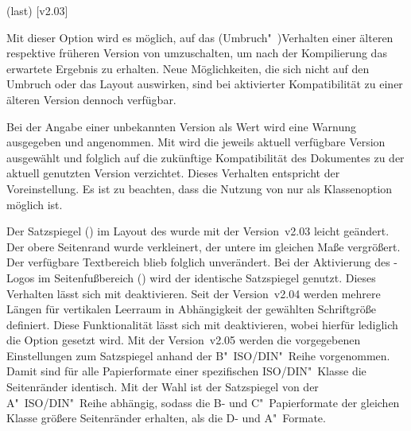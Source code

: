 \begin{Declaration}
  {}
  (last)
  [v2.03]
\printdeclarationlist

Mit dieser Option wird es möglich, auf das (Umbruch"~)Verhalten einer älteren 
respektive früheren Version von \TUDScript umzuschalten, um nach der 
Kompilierung das erwartete Ergebnis zu erhalten. Neue Möglichkeiten, die sich 
nicht auf den Umbruch oder das Layout auswirken, sind bei aktivierter 
Kompatibilität zu einer älteren Version dennoch verfügbar. 

Bei der Angabe einer unbekannten Version als Wert wird eine Warnung ausgegeben 
und  angenommen. Mit  wird die 
jeweils aktuell verfügbare Version ausgewählt und folglich auf die zukünftige 
Kompatibilität des Dokumentes zu der aktuell genutzten Version verzichtet. 
Dieses Verhalten entspricht der Voreinstellung. Es ist zu beachten, dass die 
Nutzung von  nur als Klassenoption möglich ist.
\begin{DeclareValues}
  Der Satzspiegel () im Layout des 
  \CDs wurde mit der Version~v2.03 leicht geändert. Der obere Seitenrand wurde 
  verkleinert, der untere im gleichen Maße vergrößert. Der verfügbare 
  Textbereich blieb folglich unverändert. Bei der Aktivierung des \DDC-Logos im 
  Seitenfußbereich () wird der 
  identische Satzspiegel genutzt. Dieses Verhalten lässt sich mit 
   deaktivieren.
  Seit der Version~v2.04 werden mehrere Längen für vertikalen Leerraum in 
  Abhängigkeit der gewählten Schriftgröße definiert. Diese Funktionalität lässt 
  sich mit  deaktivieren, wobei hierfür lediglich die 
  Option  gesetzt wird. 
  Mit der Version~v2.05 werden die vorgegebenen Einstellungen zum Satzspiegel 
  anhand der B"~ISO/DIN"~Reihe vorgenommen. Damit sind für alle Papierformate 
  einer spezifischen ISO/DIN"~Klasse die Seitenränder identisch. Mit der Wahl 
   ist der Satzspiegel von der A"~ISO/DIN"~Reihe 
  abhängig, sodass die B- und C"~Papierformate der gleichen Klasse größere 
  Seitenränder erhalten, als die D- und A"~Formate.

\end{DeclareValues}
\end{Declaration}
